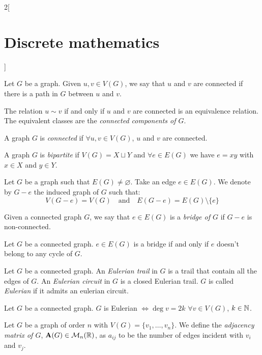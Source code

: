 \documentclass[../../../main.tex]{subfiles}
\begin{document}
\begin{multicols}{2}[\section{Discrete mathematics}]
\begin{prop}
    \end{prop}
    \begin{definition}
        Let $G$ be a graph. Given $u,v\in V(G)$, we say that $u$ and $v$ are connected if there is a path in $G$ between $u$ and $v$.
    \end{definition}
    \begin{prop}
        The relation $u\sim v$ if and only if $u$ and $v$ are connected is an equivalence relation. The equivalent classes are the \textit{connected components of $G$}.
    \end{prop}
    \begin{definition}
        A graph $G$ is \textit{connected} if $\forall u,v\in V(G)$, $u$ and $v$ are connected.
    \end{definition}
    \begin{definition}
        A graph $G$ is \textit{bipartite} if $V(G)=X\sqcup Y$ and $\forall e\in E(G)$ we have $e=xy$ with $x\in X$ and $y\in Y$.
    \end{definition}
    \begin{definition}
        Let $G$ be a graph such that $E(G)\ne\varnothing$. Take an edge $e\in E(G)$. We denote by $G-e$ the induced graph of $G$ such that: $$V(G-e)=V(G)\quad\text{and}\quad E(G-e)=E(G)\setminus\{e\}$$
    \end{definition}
    \begin{definition}
        Given a connected graph $G$, we say that $e\in E(G)$ is a \textit{bridge of $G$} if $G-e$ is non-connected.
    \end{definition}
    \begin{prop}
        Let $G$ be a connected graph. $e\in E(G)$ is a bridge if and only if $e$ doesn't belong to any cycle of $G$.
    \end{prop}
    \begin{definition}
        Let $G$ be a connected graph. An \textit{Eulerian trail} in $G$ is a trail that contain all the edges of $G$. An \textit{Eulerian circuit} in $G$ is a closed Eulerian trail. $G$ is called \textit{Eulerian} if it admits an eulerian circuit.
    \end{definition}
    \begin{theorem}
        Let $G$ be a connected graph. $G$ is Eulerian $\iff\deg v=2k$ $\forall v\in V(G)$, $k\in\mathbb{N} $.
    \end{theorem}
    \begin{definition}
        Let $G$ be a graph of order $n$ with $V(G)=\{v_1,\ldots,v_n\}$. We define the \textit{adjacency matrix of $G$}, $\boldsymbol{\mathrm{A}}(G)\in\mathcal{M}_n(\mathbb{R} )$, as $a_{ij}$ to be the number of edges incident with $v_i$ and $v_j$.

\end{definition}
\end{multicols}
\end{document}
